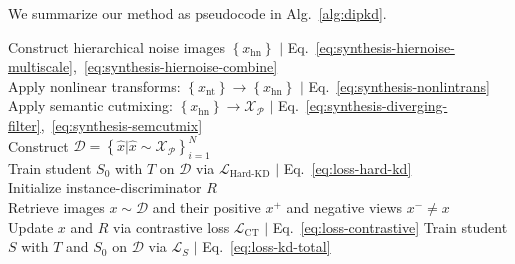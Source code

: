 We summarize our method as pseudocode in Alg.~\ref{alg:dipkd}.
\begin{algorithm} %
    
    \caption{Proposed method \textbf{\methodname}}
    \label{alg:dipkd}


    \vspace{-0.5\baselineskip}
    \Comment{\noindent\hrulefill}

    Construct hierarchical noise images $\left\{ x_\text{hn} \right\}$ \hfill $|$ Eq.~\ref{eq:synthesis-hiernoise-multiscale},~\ref{eq:synthesis-hiernoise-combine} \\
    Apply nonlinear transforms: $\left\{ x_\text{nt}\right\} \to \left\{x_\text{hn} \right\}$ \hfill $|$ Eq.~\ref{eq:synthesis-nonlintrans} \\
    Apply semantic cutmixing: $\left\{x_\text{hn} \right\} \to \mathcal{X}_\mathcal{P}$ \hfill $|$ Eq.~\ref{eq:synthesis-diverging-filter},~\ref{eq:synthesis-semcutmix}\\
    
    \vspace{0.5\baselineskip}
    Construct $\mathcal{D} = \left\{ \hat{x} | \hat{x} \sim \mathcal{X}_\mathcal{P} \right\}_{i=1}^N$\\
    Train student $S_0$ with $T$ on $\mathcal{D}$ via $\mathcal{L}_\text{Hard-KD}$ \hfill $|$ Eq.~\ref{eq:loss-hard-kd} \\
    Initialize instance-discriminator $R$ \\
     {
        Retrieve images $x\sim\mathcal{D}$ and their positive $x^+$ and negative views $x^- \ne x$ \\
        Update $x$ and $R$ via contrastive loss $\mathcal{L}_\text{CT}$ \hfill $|$ Eq.~\ref{eq:loss-contrastive}
    }
    \vspace{0.5\baselineskip}
    Train student $S$ with $T$ and $S_0$ on $\mathcal{D}$ via $\mathcal{L}_{S}$ \hfill $|$ Eq.~\ref{eq:loss-kd-total}

    \vspace{0.5\baselineskip}
\end{algorithm}
